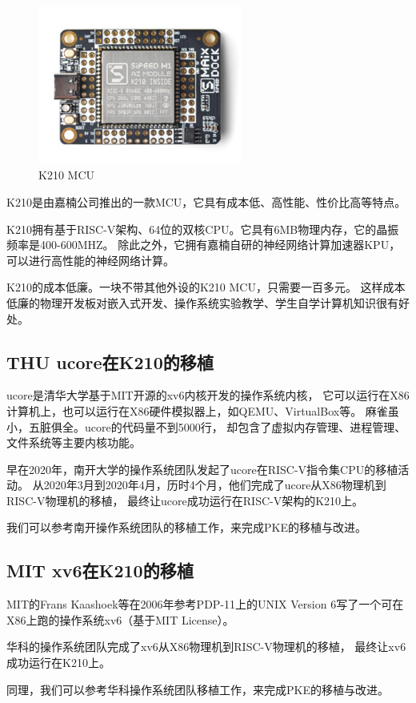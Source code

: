 \begin{figure}[htbp]
    \vspace{13pt} %
    \centering
    \includegraphics[width=0.6\textwidth]{images/K210.png}
    \caption{K210 MCU}\label{K210 MCU} %
\end{figure}

K210是由嘉楠公司推出的一款MCU，它具有成本低、高性能、性价比高等特点\cite{2018嘉楠科技勘智}。

K210拥有基于RISC-V架构、64位的双核CPU。它具有6MB物理内存，它的晶振频率是400-600MHZ。
除此之外，它拥有嘉楠自研的神经网络计算加速器KPU，可以进行高性能的神经网络计算。

K210的成本低廉。一块不带其他外设的K210 MCU，只需要一百多元。
这样成本低廉的物理开发板对嵌入式开发、操作系统实验教学、学生自学计算机知识很有好处。

\subsection{THU ucore在K210的移植}

ucore是清华大学基于MIT开源的xv6内核开发的操作系统内核，
它可以运行在X86计算机上，也可以运行在X86硬件模拟器上，如QEMU、VirtualBox等。
麻雀虽小，五脏俱全。ucore的代码量不到5000行，
却包含了虚拟内存管理、进程管理、文件系统等主要内核功能。

早在2020年，南开大学的操作系统团队发起了ucore在RISC-V指令集CPU的移植活动。
从2020年3月到2020年4月，历时4个月，他们完成了ucore从X86物理机到RISC-V物理机的移植，
最终让ucore成功运行在RISC-V架构的K210上\cite{NKU_ucore_GitHub}。

我们可以参考南开操作系统团队的移植工作，来完成PKE的移植与改进。

\subsection{MIT xv6在K210的移植}

MIT的Frans Kaashoek等在2006年参考PDP-11上的UNIX Version 6写了一个可在X86上跑的操作系统xv6（基于MIT License）。

华科的操作系统团队完成了xv6从X86物理机到RISC-V物理机的移植，
最终让xv6成功运行在K210上\cite{xv6_k210_GitHub}。

同理，我们可以参考华科操作系统团队移植工作，来完成PKE的移植与改进。